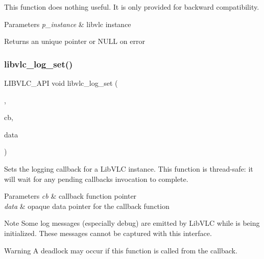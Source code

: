 This function does nothing useful. It is only provided for backward compatibility.


\begin{DoxyParams}{Parameters}
{\em p\+\_\+instance} & libvlc instance \\
\hline
\end{DoxyParams}
\begin{DoxyReturn}{Returns}
an unique pointer or N\+U\+LL on error 
\end{DoxyReturn}
\mbox{\label{group__libvlc__log_ga0f01a3cfa2c13a1253e932af6e0b12c5}} 
\subsubsection{\texorpdfstring{libvlc\+\_\+log\+\_\+set()}{libvlc\_log\_set()}}
{\footnotesize\ttfamily L\+I\+B\+V\+L\+C\+\_\+\+A\+PI void libvlc\+\_\+log\+\_\+set (\begin{DoxyParamCaption}\item[{\hyperlink{group__libvlc__core_ga316d739a80da4678206c79f4d6c2e284}{libvlc\+\_\+instance\+\_\+t} $\ast$}]{,  }\item[{\hyperlink{group__libvlc__log_ga2bc7c11ca559e643b90fc4d55f0c131c}{libvlc\+\_\+log\+\_\+cb}}]{cb,  }\item[{void $\ast$}]{data }\end{DoxyParamCaption})}

Sets the logging callback for a Lib\+V\+LC instance. This function is thread-\/safe\+: it will wait for any pending callbacks invocation to complete.


\begin{DoxyParams}{Parameters}
{\em cb} & callback function pointer \\
\hline
{\em data} & opaque data pointer for the callback function\\
\hline
\end{DoxyParams}
\begin{DoxyNote}{Note}
Some log messages (especially debug) are emitted by Lib\+V\+LC while is being initialized. These messages cannot be captured with this interface.
\end{DoxyNote}
\begin{DoxyWarning}{Warning}
A deadlock may occur if this function is called from the callback.
\end{DoxyWarning}

